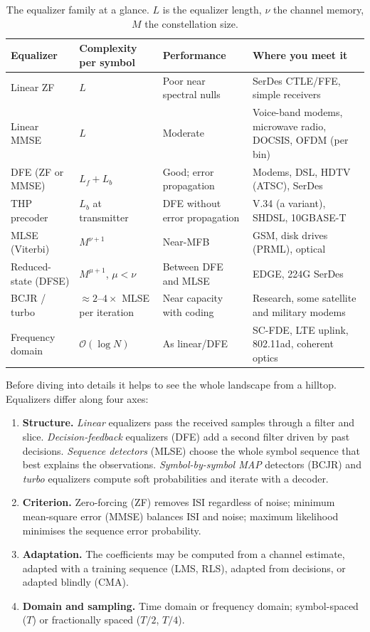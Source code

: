 \begin{table}[htbp]\centering\small
\caption{The equalizer family at a glance. $L$ is the equalizer length, $\nu$ the channel memory,
$M$ the constellation size.}
\label{tab:ch12:family}
\begin{tabular}{p{2.5cm}p{2.5cm}p{3.3cm}p{5.0cm}}
\toprule
Equalizer & Complexity per symbol & Performance & Where you meet it \\
\midrule
Linear ZF & $L$ & Poor near spectral nulls & SerDes CTLE/FFE, simple receivers \\
Linear MMSE & $L$ & Moderate & Voice-band modems, microwave radio, DOCSIS, OFDM (per bin) \\
DFE (ZF or MMSE) & $L_f+L_b$ & Good; error propagation & Modems, DSL, HDTV (ATSC), SerDes \\
THP precoder & $L_b$ at transmitter & DFE without error propagation & V.34 (a variant), SHDSL, 10GBASE-T \\
MLSE (Viterbi) & $M^{\nu+1}$ & Near-MFB & GSM, disk drives (PRML), optical \\
Reduced-state (DFSE) & $M^{\mu+1}$, $\mu<\nu$ & Between DFE and MLSE & EDGE, 224G SerDes \\
BCJR / turbo & $\approx 2$--$4\times$ MLSE per iteration & Near capacity with coding & Research, some satellite and military modems \\
Frequency domain & $\mathcal O(\log N)$ & As linear/DFE & SC-FDE, LTE uplink, 802.11ad, coherent optics \\
\bottomrule
\end{tabular}
\end{table}
\label{sec:ch12:landscape}

Before diving into details it helps to see the whole landscape from a hilltop. Equalizers differ
along four axes:
\begin{enumerate}
\item \textbf{Structure.} \emph{Linear} equalizers pass the received samples through a filter and
slice. \emph{Decision-feedback} equalizers (DFE) add a second filter driven by past decisions.
\emph{Sequence detectors} (MLSE) choose the whole symbol sequence that best explains the
observations. \emph{Symbol-by-symbol MAP} detectors (BCJR) and \emph{turbo} equalizers compute soft
probabilities and iterate with a decoder.
\item \textbf{Criterion.} Zero-forcing (ZF) removes ISI regardless of noise; minimum mean-square
error (MMSE) balances ISI and noise; maximum likelihood minimises the sequence error probability.
\item \textbf{Adaptation.} The coefficients may be computed from a channel estimate, adapted with a
training sequence (LMS, RLS), adapted from decisions, or adapted blindly (CMA).
\item \textbf{Domain and sampling.} Time domain or frequency domain; symbol-spaced ($T$) or
fractionally spaced ($T/2$, $T/4$).
\end{enumerate}

